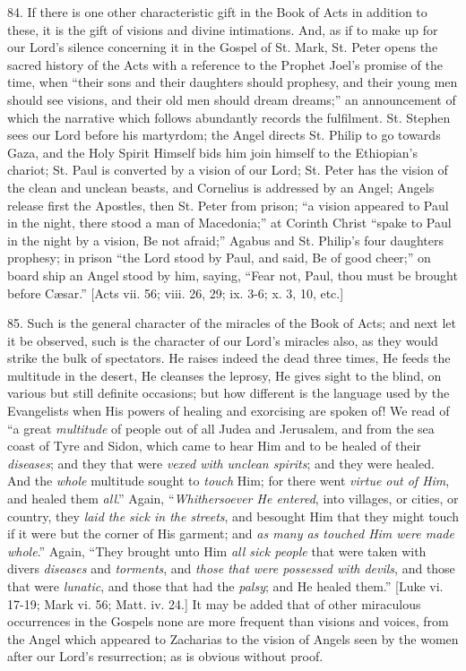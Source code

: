 84.
If there is one other characteristic gift in the Book of Acts in
addition to these, it is the gift of visions and divine intimations.
And, as if to make up for our Lord's silence concerning it in the
Gospel of St. Mark, St. Peter opens the sacred history of the Acts
with a reference to the Prophet Joel's promise of the time, when ``their
sons and their daughters should prophesy, and their young men should
see visions, and their old men should dream dreams;'' an announcement
of which the narrative which follows abundantly records the fulfilment.
St. Stephen sees our Lord before his martyrdom; the Angel directs St.
Philip to go towards Gaza, and the Holy Spirit Himself bids him join
himself to the Ethiopian's chariot; St. Paul is converted by a vision
of our Lord; St. Peter has the vision of the clean and unclean beasts,
and Cornelius is addressed by an Angel; Angels release first the
Apostles, then St. Peter from prison; ``a vision appeared to Paul in
the night, there stood a man of Macedonia;'' at Corinth Christ ``spake
to Paul in the night by a vision, Be not afraid;'' Agabus and St.
Philip's four daughters prophesy; in prison ``the Lord stood by Paul,
and said, Be of good cheer;'' on board ship an Angel stood by him,
saying, ``Fear not, Paul, thou must be brought before Cæsar.'' [Acts
vii. 56; viii. 26, 29; ix. 3-6; x. 3, 10, etc.]

85.
Such is the general character of the miracles of the Book of Acts; and
next let it be observed, such is the character of our Lord's miracles
also, as they would strike the bulk of spectators. He raises indeed
the dead three times, He feeds the multitude in the desert, He
cleanses the leprosy, He gives sight to the blind, on various but
still definite occasions; but how different is the language used by
the Evangelists when His powers of healing and exorcising are spoken
of! We read of ``a great \emph{multitude} of people out of all Judea
and Jerusalem, and from the sea coast of Tyre and Sidon, which came to
hear Him and to be healed of their \emph{diseases}; and they that were
\emph{vexed with unclean spirits}; and they were healed. And the \emph{whole}
multitude sought to \emph{touch} Him; for there went \emph{virtue out of
Him}, and healed them \emph{all}.'' Again, ``\emph{Whithersoever He
entered}, into villages, or cities, or country, they \emph{laid the
sick in the streets}, and besought Him that they might touch if it
were but the corner of His garment; and \emph{as many as touched Him were
made whole}.'' Again, ``They brought unto Him \emph{all sick people}
that were taken with divers \emph{diseases} and \emph{torments}, and
\emph{those that were possessed with devils}, and those that
were \emph{lunatic}, and those that had the \emph{palsy}; and He
healed them.'' [Luke vi. 17-19; Mark vi. 56; Matt. iv. 24.] It may be
added that of other miraculous occurrences in the Gospels none are
more frequent than visions and voices, from the Angel which appeared
to Zacharias to the vision of Angels seen by the women after our Lord's
resurrection; as is obvious without proof.

